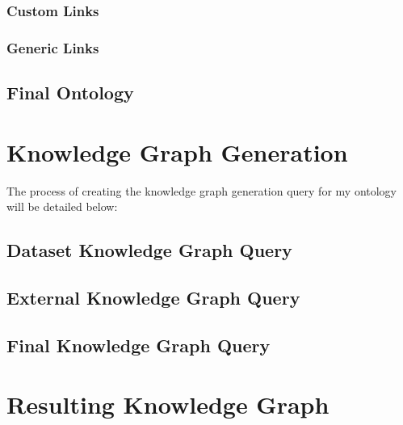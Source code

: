 \subsubsection{Custom Links}
\hspace*{0.5cm} 


\subsubsection{Generic Links}
\hspace*{0.5cm} 


\subsection{Final Ontology}
\hspace*{0.5cm} 

\section{Knowledge Graph Generation}
\hspace*{0.5cm} The process of creating the knowledge graph generation query for my ontology will be detailed below:

\subsection{Dataset Knowledge Graph Query}

\subsection{External Knowledge Graph Query}

\subsection{Final Knowledge Graph Query}


\section{Resulting Knowledge Graph}
\hspace*{0.5cm} 




